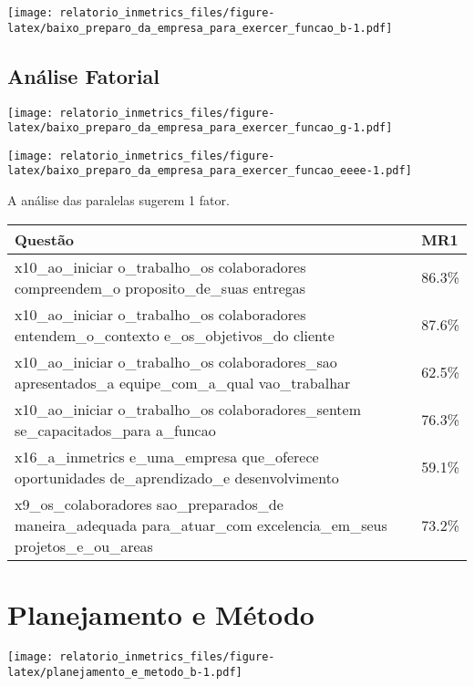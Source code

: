 \documentclass[]{book}
\begin{document}
\texttt{[image: relatorio\_inmetrics\_files/figure-latex/baixo\_preparo\_da\_empresa\_para\_exercer\_funcao\_b-1.pdf]}

\hypertarget{analise-fatorial-2}{%
\subsection{Análise Fatorial}\label{analise-fatorial-2}}

\texttt{[image: relatorio\_inmetrics\_files/figure-latex/baixo\_preparo\_da\_empresa\_para\_exercer\_funcao\_g-1.pdf]}

\texttt{[image: relatorio\_inmetrics\_files/figure-latex/baixo\_preparo\_da\_empresa\_para\_exercer\_funcao\_eeee-1.pdf]}

A análise das paralelas sugerem 1 fator.

\begin{table}[H]
\centering\begingroup\fontsize{12}{14}\selectfont

\begin{tabular}{>{\raggedright\arraybackslash}p{20em}l}
\toprule
Questão & MR1\\
\midrule
x10\_ao\_iniciar
o\_trabalho\_os
colaboradores
compreendem\_o
proposito\_de\_suas
entregas & 86.3\%\\
x10\_ao\_iniciar
o\_trabalho\_os
colaboradores
entendem\_o\_contexto
e\_os\_objetivos\_do
cliente & 87.6\%\\
x10\_ao\_iniciar
o\_trabalho\_os
colaboradores\_sao
apresentados\_a
equipe\_com\_a\_qual
vao\_trabalhar & 62.5\%\\
x10\_ao\_iniciar
o\_trabalho\_os
colaboradores\_sentem
se\_capacitados\_para
a\_funcao & 76.3\%\\
x16\_a\_inmetrics
e\_uma\_empresa
que\_oferece
oportunidades
de\_aprendizado\_e
desenvolvimento & 59.1\%\\
\addlinespace
x9\_os\_colaboradores
sao\_preparados\_de
maneira\_adequada
para\_atuar\_com
excelencia\_em\_seus
projetos\_e\_ou\_areas & 73.2\%\\
\bottomrule
\end{tabular}
\endgroup{}
\end{table}

\hypertarget{planejamento-e-metodo}{%
\section{Planejamento e Método}\label{planejamento-e-metodo}}

\texttt{[image: relatorio\_inmetrics\_files/figure-latex/planejamento\_e\_metodo\_b-1.pdf]}
\end{document}
